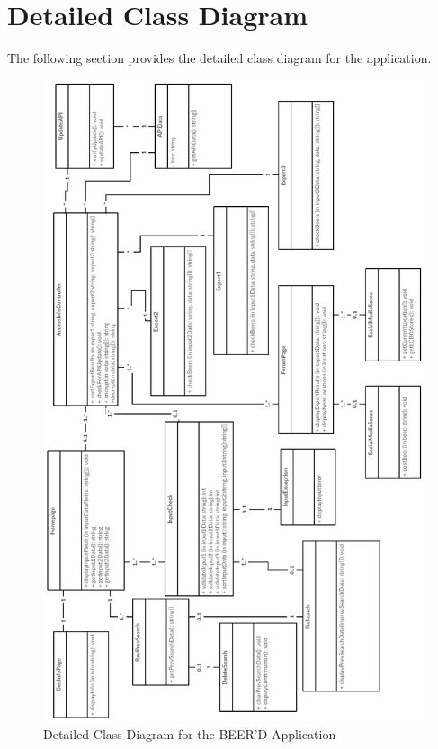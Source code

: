 \documentclass[]{article}
\begin{document}
\newpage
\section{Detailed Class Diagram}
\label{sec:detailed_class_diagram}
The following section provides the detailed class diagram for the application.
\begin{figure}[!htbp]
\includegraphics[scale=0.36, center]{detailedclass_diagram}
\caption{Detailed Class Diagram for the BEER'D Application}
\end{figure}
\end{document}
